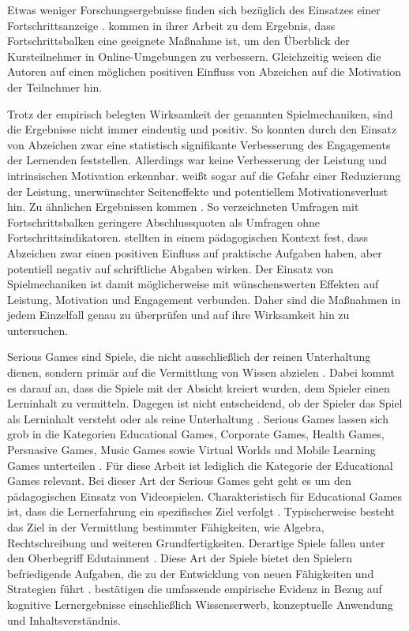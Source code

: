 \documentclass[
    a4paper,
    doc,
    12pt,
    natbib,
]{apa6}
\begin{document}
Etwas weniger Forschungsergebnisse finden sich bezüglich des Einsatzes einer Fortschrittsanzeige \citep{koivisto_rise_2019}.
\cite{olsson_visualisation_2016} kommen in ihrer Arbeit zu dem Ergebnis, dass Fortschrittsbalken eine geeignete Maßnahme ist, um den Überblick der Kursteilnehmer in Online-Umgebungen zu verbessern. Gleichzeitig weisen die Autoren auf einen möglichen positiven Einfluss von Abzeichen auf die Motivation der Teilnehmer hin.

Trotz der empirisch belegten Wirksamkeit der genannten Spielmechaniken, sind die Ergebnisse nicht immer eindeutig und positiv.
So konnten \cite{ortiz_gamification_2017} durch den Einsatz von Abzeichen zwar eine statistisch signifikante Verbesserung des Engagements der Lernenden feststellen.
Allerdings war keine Verbesserung der Leistung und intrinsischen Motivation erkennbar.
\cite{toda_dark_2018} weißt sogar auf die Gefahr einer Reduzierung der Leistung, unerwünschter Seiteneffekte und potentiellem Motivationsverlust hin.
Zu ähnlichen Ergebnissen kommen \cite{liu_examining_2017}.
So verzeichneten Umfragen mit Fortschrittsbalken geringere Abschlussquoten als Umfragen ohne Fortschrittsindikatoren. \cite{dominguez_gamifying_2013} stellten in einem pädagogischen Kontext fest, dass Abzeichen zwar einen positiven Einfluss auf praktische Aufgaben haben, aber potentiell negativ auf schriftliche Abgaben wirken. Der Einsatz von Spielmechaniken ist damit möglicherweise mit wünschenswerten Effekten auf Leistung, Motivation und Engagement verbunden. Daher sind die Maßnahmen in jedem Einzelfall genau zu überprüfen und auf ihre Wirksamkeit hin zu untersuchen.

Serious Games sind Spiele, die nicht ausschließlich der reinen Unterhaltung dienen, sondern primär auf die Vermittlung von Wissen abzielen \citep[S.17]{michael_serious_2005}.
Dabei kommt es darauf an, dass die Spiele mit der Absicht kreiert wurden, dem Spieler einen Lerninhalt zu vermitteln.
Dagegen ist nicht entscheidend, ob der Spieler das Spiel als Lerninhalt versteht oder als reine Unterhaltung \citep[S.3]{bopp_serious_2009}.
Serious Games lassen sich grob in die Kategorien Educational  Games, 
Corporate  Games,  Health  Games,  Persuasive  Games,  Music  Games  sowie  Virtual  Worlds  und 
Mobile Learning Games unterteilen \citep[S.4]{bopp_serious_2009}.
Für diese Arbeit ist lediglich die Kategorie der Educational  Games relevant.
Bei dieser Art der Serious Games geht geht es um den pädagogischen Einsatz von Videospielen.
Charakteristisch für Educational  Games ist, dass die Lernerfahrung ein spezifisches Ziel verfolgt \citep{egenfeldt-nielsen_overview_2006, bopp_serious_2009}.
Typischerweise besteht das Ziel in der Vermittlung bestimmter Fähigkeiten, wie Algebra, Rechtschreibung und weiteren Grundfertigkeiten.
Derartige Spiele fallen unter den Oberbegriff Edutainment \citep{egenfeldt-nielsen_overview_2006}.
Diese Art der Spiele bietet den Spielern befriedigende Aufgaben, die zu der Entwicklung von neuen Fähigkeiten und Strategien führt \citep{stapleton_serious_2004}.
\cite{vlachopoulos_effect_2017} bestätigen die umfassende empirische Evidenz in Bezug auf kognitive Lernergebnisse einschließlich Wissenserwerb, konzeptuelle Anwendung und Inhaltsverständnis.
\end{document}
